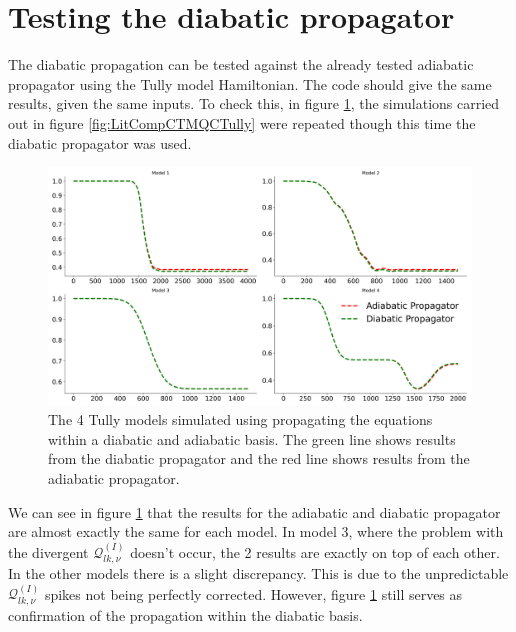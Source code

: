 \section{Testing the diabatic propagator}
The diabatic propagation can be tested against the already tested adiabatic propagator using the Tully model Hamiltonian. The code should give the same results, given the same inputs. To check this, in figure \ref{fig:diab_prop_vs_adiab}, the simulations carried out in figure \ref{fig:LitCompCTMQCTully} were repeated though this time the diabatic propagator was used.
\begin{figure}[ht]
  \includegraphics[width=\textwidth]{./img/CTMQC/TullyModels/CTMQC_ad_vs_di_wTraj_pops.png}
  \caption{\label{fig:diab_prop_vs_adiab}The 4 Tully models simulated using propagating the equations within a diabatic and adiabatic basis. The green line shows results from the diabatic propagator and the red line shows results from the adiabatic propagator.}
\end{figure}
We can see in figure \ref{fig:diab_prop_vs_adiab} that the results for the adiabatic and diabatic propagator are almost exactly the same for each model. In model 3, where the problem with the divergent $\mathcal{Q}_{lk, \nu}^{(I)}$ doesn't occur, the 2 results are exactly on top of each other. In the other models there is a slight discrepancy. This is due to the unpredictable $\mathcal{Q}_{lk, \nu}^{(I)}$ spikes not being perfectly corrected. However, figure \ref{fig:diab_prop_vs_adiab} still serves as confirmation of the propagation within the diabatic basis.

